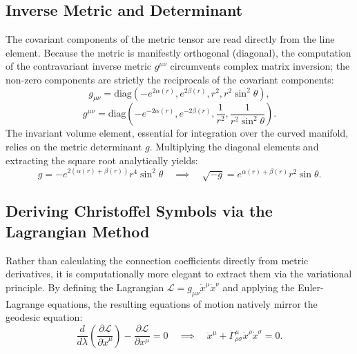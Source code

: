 \documentclass[11pt, a4paper]{report}
\begin{document}
\subsection{Inverse Metric and Determinant}
The covariant components of the metric tensor are read directly from the line element. Because the metric is manifestly orthogonal (diagonal), the computation of the contravariant inverse metric $g^{\mu\nu}$ circumvents complex matrix inversion; the non-zero components are strictly the reciprocals of the covariant components:
\begin{equation}
g_{\mu\nu} = \text{diag}\left(-e^{2\alpha(r)}, e^{2\beta(r)}, r^2, r^2 \sin^2\theta\right),
\end{equation}
\begin{equation}
g^{\mu\nu} = \text{diag}\left(-e^{-2\alpha(r)}, e^{-2\beta(r)}, \frac{1}{r^2}, \frac{1}{r^2 \sin^2\theta}\right).
\end{equation}
The invariant volume element, essential for integration over the curved manifold, relies on the metric determinant $g$. Multiplying the diagonal elements and extracting the square root analytically yields:
\begin{equation}
g = - e^{2(\alpha(r) + \beta(r))} r^4 \sin^2\theta \quad \implies \quad \sqrt{-g} = e^{\alpha(r) + \beta(r)} r^2 \sin\theta.
\end{equation}

\subsection{Deriving Christoffel Symbols via the Lagrangian Method}
Rather than calculating the connection coefficients directly from metric derivatives, it is computationally more elegant to extract them via the variational principle. By defining the Lagrangian $\mathcal{L} = g_{\mu\nu} \dot{x}^\mu \dot{x}^\nu$ and applying the Euler-Lagrange equations, the resulting equations of motion natively mirror the geodesic equation:
\begin{equation}
\frac{d}{d\lambda} \left( \frac{\partial \mathcal{L}}{\partial \dot{x}^\mu} \right) - \frac{\partial \mathcal{L}}{\partial x^\mu} = 0 \quad \implies \quad \ddot{x}^\mu + \Gamma^\mu_{\rho\sigma} \dot{x}^\rho \dot{x}^\sigma = 0. \label{eq:EL_general}
\end{equation}
\end{document}
